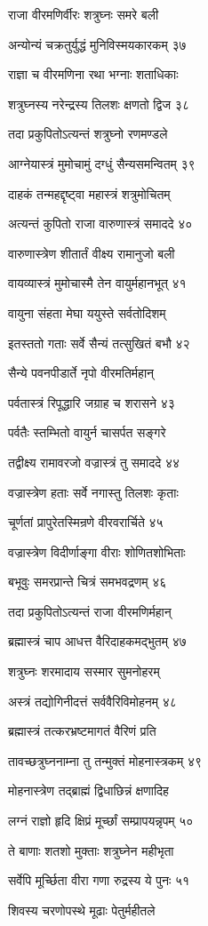 राजा वीरमणिर्वीरः शत्रुघ्नः समरे बली

अन्योन्यं चक्रतुर्युद्धं मुनिविस्मयकारकम् ३७

राज्ञा च वीरमणिना रथा भग्नाः शताधिकाः

शत्रुघ्नस्य नरेन्द्रस्य तिलशः क्षणतो द्विज ३८

तदा प्रकुपितोऽत्यन्तं शत्रुघ्नो रणमण्डले

आग्नेयास्त्रं मुमोचामुं दग्धुं सैन्यसमन्वितम् ३९

दाहकं तन्महद्दृष्ट्वा महास्त्रं शत्रुमोचितम्

अत्यन्तं कुपितो राजा वारुणास्त्रं समाददे ४०

वारुणास्त्रेण शीतार्तं वीक्ष्य रामानुजो बली

वायव्यास्त्रं मुमोचास्मै तेन वायुर्महानभूत् ४१

वायुना संहता मेघा ययुस्ते सर्वतोदिशम्

इतस्ततो गताः सर्वे सैन्यं तत्सुखितं बभौ ४२

सैन्ये पवनपीडार्ते नृपो वीरमतिर्महान्

पर्वतास्त्रं रिपूद्धारि जग्राह च शरासने ४३

पर्वतैः स्तम्भितो वायुर्न चासर्पत सङ्गरे

तद्वीक्ष्य रामावरजो वज्रास्त्रं तु समाददे ४४

वज्रास्त्रेण हताः सर्वे नगास्तु तिलशः कृताः

चूर्णतां प्रापुरेतस्मिन्रणे वीरवरार्चिते ४५

वज्रास्त्रेण विदीर्णाङ्गा वीराः शोणितशोभिताः

बभूवुः समरप्रान्ते चित्रं समभवद्रणम् ४६

तदा प्रकुपितोऽत्यन्तं राजा वीरमणिर्महान्

ब्रह्मास्त्रं चाप आधत्त वैरिदाहकमद्भुतम् ४७

शत्रुघ्नः शरमादाय सस्मार सुमनोहरम्

अस्त्रं तद्योगिनीदत्तं सर्ववैरिविमोहनम् ४८

ब्रह्मास्त्रं तत्करभ्रष्टमागतं वैरिणं प्रति

तावच्छत्रुघ्ननाम्ना तु तन्मुक्तं मोहनास्त्रकम् ४९

मोहनास्त्रेण तद्ब्राह्मं द्विधाछिन्नं क्षणादिह

लग्नं राज्ञो हृदि क्षिप्रं मूर्च्छां सम्प्रापयन्नृपम् ५०

ते बाणाः शतशो मुक्ताः शत्रुघ्नेन महीभृता

सर्वेपि मूर्च्छिता वीरा गणा रुद्रस्य ये पुनः ५१

शिवस्य चरणोपस्थे मूढाः पेतुर्महीतले

